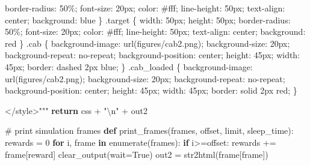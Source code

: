\documentclass[
  letterpaper,
]{scrbook}
\newenvironment{Shaded}{\begin{snugshade}}{\end{snugshade}}
\newcommand{\BuiltInTok}[1]{\textcolor[rgb]{0.00,0.23,0.31}{#1}}
\newcommand{\CharTok}[1]{\textcolor[rgb]{0.13,0.47,0.30}{#1}}
\newcommand{\CommentTok}[1]{\textcolor[rgb]{0.37,0.37,0.37}{#1}}
\newcommand{\ControlFlowTok}[1]{\textcolor[rgb]{0.00,0.23,0.31}{\textbf{#1}}}
\newcommand{\DecValTok}[1]{\textcolor[rgb]{0.68,0.00,0.00}{#1}}
\newcommand{\KeywordTok}[1]{\textcolor[rgb]{0.00,0.23,0.31}{\textbf{#1}}}
\newcommand{\NormalTok}[1]{\textcolor[rgb]{0.00,0.23,0.31}{#1}}
\newcommand{\OperatorTok}[1]{\textcolor[rgb]{0.37,0.37,0.37}{#1}}
\newcommand{\StringTok}[1]{\textcolor[rgb]{0.13,0.47,0.30}{#1}}
\newcommand{\VariableTok}[1]{\textcolor[rgb]{0.07,0.07,0.07}{#1}}
\begin{document}
\begin{Shaded}
\begin{Highlighting}[]
\StringTok{              border{-}radius: 50\%;}
\StringTok{              font{-}size: 20px;}
\StringTok{              color: \#fff;}
\StringTok{              line{-}height: 50px;}
\StringTok{              text{-}align: center;}
\StringTok{              background: blue}
\StringTok{            \}}
\StringTok{            .target \{}
\StringTok{              width: 50px;}
\StringTok{              height: 50px;}
\StringTok{              border{-}radius: 50\%;}
\StringTok{              font{-}size: 20px;}
\StringTok{              color: \#fff;}
\StringTok{              line{-}height: 50px;}
\StringTok{              text{-}align: center;}
\StringTok{              background: red}
\StringTok{            \}}
\StringTok{            .cab \{}
\StringTok{               background{-}image: url(figures/cab2.png);}
\StringTok{               background{-}size: 20px;}
\StringTok{               background{-}repeat: no{-}repeat;}
\StringTok{               background{-}position: center; }
\StringTok{               height: 45px;}
\StringTok{               width: 45px;}
\StringTok{               border: dashed 2px blue;}
\StringTok{            \}}
\StringTok{            .cab\_loaded \{}
\StringTok{               background{-}image: url(figures/cab2.png);}
\StringTok{               background{-}size: 20px;}
\StringTok{               background{-}repeat: no{-}repeat;}
\StringTok{               background{-}position: center; }
\StringTok{               height: 45px;}
\StringTok{               width: 45px;}
\StringTok{               border: solid 2px red;}
\StringTok{            \}}

\StringTok{            \textless{}/style\textgreater{}"""}
    \ControlFlowTok{return}\NormalTok{ css }\OperatorTok{+} \StringTok{"}\CharTok{\textbackslash{}n}\StringTok{"} \OperatorTok{+}\NormalTok{ out2}

\CommentTok{\# print simulation frames}
\KeywordTok{def}\NormalTok{ print\_frames(frames, offset, limit, sleep\_time):}
\NormalTok{    rewards }\OperatorTok{=} \DecValTok{0}
    \ControlFlowTok{for}\NormalTok{ i, frame }\KeywordTok{in} \BuiltInTok{enumerate}\NormalTok{(frames): }
        \ControlFlowTok{if}\NormalTok{ i}\OperatorTok{\textgreater{}=}\NormalTok{offset: }
\NormalTok{            rewards }\OperatorTok{+=}\NormalTok{ frame[}\StringTok{\textquotesingle{}reward\textquotesingle{}}\NormalTok{]}
\NormalTok{            clear\_output(wait}\OperatorTok{=}\VariableTok{True}\NormalTok{)}
\NormalTok{            out2 }\OperatorTok{=}\NormalTok{ str2html(frame[}\StringTok{\textquotesingle{}frame\textquotesingle{}}\NormalTok{])}


\end{Highlighting}
\end{Shaded}
\end{document}
